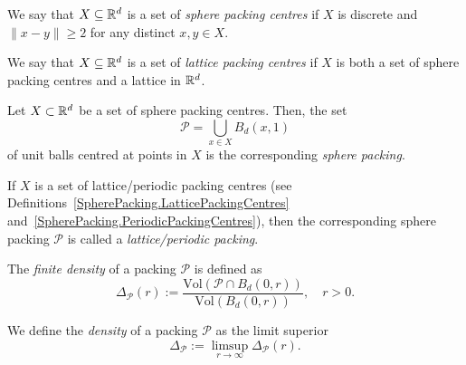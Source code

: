 \begin{definition}\label{SpherePacking.SpherePackingCentres}\leanok
  We say that $X \subseteq \mathbb{R}^d$ is a set of \emph{sphere packing centres} if $X$ is discrete and $\|x-y\|\geq2$ for any distinct $x,y\in X$.
\end{definition}

\begin{definition}\label{SpherePacking.LatticePackingCentres}\leanok
  We say that $X \subseteq \mathbb{R}^d$ is a set of \emph{lattice packing centres} if $X$ is both a set of sphere packing centres and a lattice in $\mathbb{R}^d$.
\end{definition}

\begin{definition}\label{SpherePacking.Packing_of_Centres}\leanok  %
  Let $X\subset \mathbb{R}^d$ be a set of sphere packing centres. Then, the set
$$\mathcal{P}=\bigcup_{x\in X} B_d(x,1)$$ of unit balls centred at points in $X$ is the corresponding \emph{sphere packing}.
\end{definition}

\begin{remark}
  If $X$ is a set of lattice/periodic packing centres (see Definitions~\ref{SpherePacking.LatticePackingCentres} and~\ref{SpherePacking.PeriodicPackingCentres}), then the corresponding sphere packing $\mathcal{P}$ is called a \emph{lattice/periodic packing}.
\end{remark}

\begin{definition}\label{SpherePacking.FiniteDensity}\leanok
  The \emph{finite density} of a packing $\mathcal{P}$ is defined as
$$\Delta_{\mathcal{P}}(r):=\frac{\mathrm{Vol}(\mathcal{P}\cap B_d(0,r))}{\mathrm{Vol}(B_d(0,r))},\quad r>0.$$
\end{definition}

\begin{definition}\label{SpherePacking.Density}\leanok
  We define the \emph{density} of a packing $\mathcal{P}$ as the limit superior
$$\Delta_{\mathcal{P}}:=\limsup\limits_{r\to\infty}\Delta_{\mathcal{P}}(r). $$
\end{definition}

